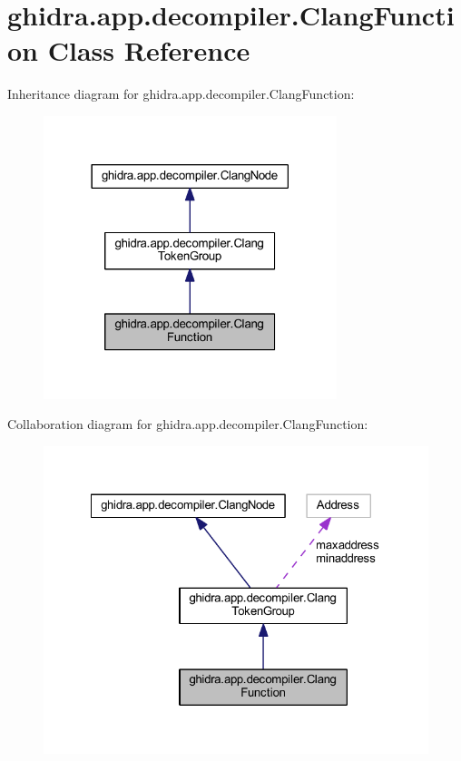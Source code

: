 \hypertarget{classghidra_1_1app_1_1decompiler_1_1_clang_function}{}\section{ghidra.\+app.\+decompiler.\+Clang\+Function Class Reference}
\label{classghidra_1_1app_1_1decompiler_1_1_clang_function}


Inheritance diagram for ghidra.\+app.\+decompiler.\+Clang\+Function\+:
\nopagebreak
\begin{figure}[H]
\begin{center}
\leavevmode
\includegraphics[width=242pt]{classghidra_1_1app_1_1decompiler_1_1_clang_function__inherit__graph}
\end{center}
\end{figure}


Collaboration diagram for ghidra.\+app.\+decompiler.\+Clang\+Function\+:
\nopagebreak
\begin{figure}[H]
\begin{center}
\leavevmode
\includegraphics[width=322pt]{classghidra_1_1app_1_1decompiler_1_1_clang_function__coll__graph}
\end{center}
\end{figure}
